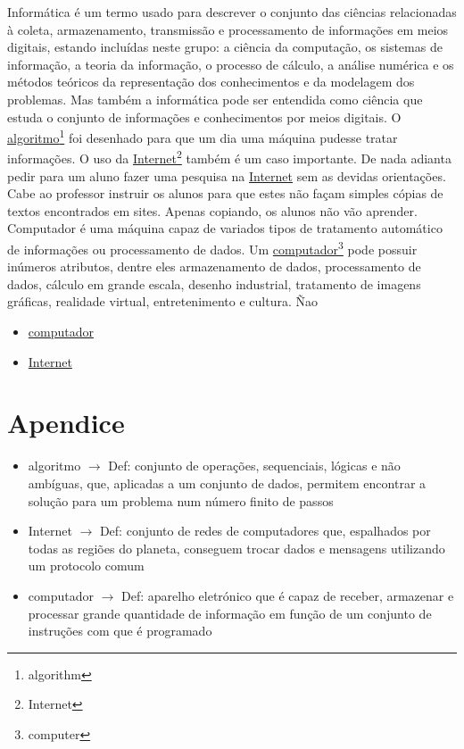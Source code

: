 \documentclass{article}
\begin{document}
Informática é um termo usado para descrever o conjunto das ciências relacionadas à coleta, 
armazenamento, transmissão e processamento de informações em meios digitais, estando incluídas 
neste grupo: a ciência da computação, os sistemas de informação, a teoria da informação, 
o processo de cálculo, a análise numérica e os métodos teóricos da representação dos 
conhecimentos e da modelagem dos problemas. Mas também a informática pode ser entendida como 
ciência que estuda o conjunto de informações e conhecimentos por meios digitais. O \underline{algoritmo}\footnote{algorithm} 
foi desenhado para que um dia uma máquina pudesse tratar informações. O uso da \underline{Internet}\footnote{Internet} também 
é um caso importante. De nada adianta pedir para um aluno fazer uma pesquisa na \underline{Internet} sem as 
devidas orientações. Cabe ao professor instruir os alunos para que estes não façam simples cópias de 
textos encontrados em sites. Apenas copiando, os alunos não vão aprender. Computador é uma máquina capaz
 de variados tipos de tratamento automático de informações ou processamento de dados. Um \underline{computador}\footnote{computer} pode 
 possuir inúmeros atributos, dentre eles armazenamento de dados, processamento de dados, cálculo em grande 
 escala, desenho industrial, tratamento de imagens gráficas, realidade virtual, entretenimento e cultura.
 Ñao
\begin{itemize}
    \item \underline{computador}
    \item \underline{Internet}
\end{itemize}
\appendix
\section{Apendice}
\begin{itemize}
\item algoritmo $\to$ Def: conjunto de operações, sequenciais, lógicas e não ambíguas, que, aplicadas a um conjunto de dados, permitem encontrar a solução para um problema num número finito de passos
\item Internet $\to$ Def: conjunto de redes de computadores que, espalhados por todas as regiões do planeta, conseguem trocar dados e mensagens utilizando um protocolo comum
\item computador $\to$ Def: aparelho eletrónico que é capaz de receber, armazenar e processar grande quantidade de informação em função de um conjunto de instruções com que é programado
\end{itemize}
\end{document}
